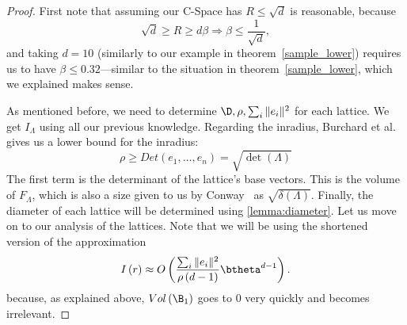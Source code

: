 \begin{proof}
    First note that assuming our C-Space has $R\leq \sqrt{d}$ is reasonable, because
        \[
        \sqrt{d}\geq R\geq d\beta\Rightarrow\beta\leq\frac{1}{\sqrt{d}},
    \]
    and taking $d=10$ (similarly to our example in theorem~\ref{sample_lower}) requires us to have $\beta\leq 0.32$---similar to the situation in theorem~\ref{sample_lower}, which we explained makes sense.

    
    As mentioned before, we need to determine $\D, \rho, \sum_i \|e_i\|^2$ for each lattice. We get $I_\Lambda$ using all our previous knowledge. Regarding the inradius, Burchard et al.~\cite{burchard2015perimeter} gives us a lower bound for the inradius:
        \[
        \rho \geq Det\left(e_1,\dots,e_n\right) = \sqrt{\det\left(\Lambda\right)}
    \]
    The first term is the determinant of the lattice's base vectors. This is the volume of $F_\Lambda$, which is also a size given to us by Conway~\cite{conway2013sphere} as $\sqrt{\delta\left(\Lambda\right)}$. Finally, the diameter of each lattice will be determined using \cref{lemma:diameter}. Let us move on to our analysis of the lattices. Note that we will be using the shortened version of the approximation
    \[
        I\left(r\right)\approx O\left(\frac{\sum_i\|e_i\|^2}{\rho\left(d-1\right)}\btheta^{d-1}\right).
    \]
    because, as explained above, $Vol\left(\B_1\right)$ goes to 0 very quickly and becomes irrelevant.



\end{proof}
